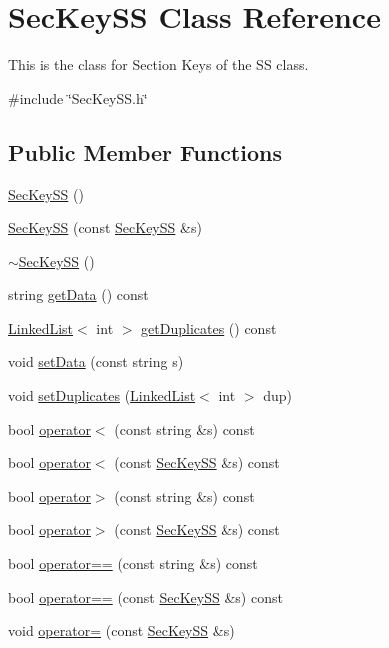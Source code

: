\hypertarget{classSecKeySS}{}\section{Sec\+Key\+SS Class Reference}
\label{classSecKeySS}


This is the class for Section Keys of the SS class.  




{\ttfamily \#include \char`\"{}Sec\+Key\+S\+S.\+h\char`\"{}}

\subsection*{Public Member Functions}
\begin{DoxyCompactItemize}
\item 
\hyperlink{classSecKeySS_ac9755234e20529a29a679c699007221c}{Sec\+Key\+SS} ()
\item 
\hyperlink{classSecKeySS_a3554b7d953e609578660dc27c8c855c5}{Sec\+Key\+SS} (const \hyperlink{classSecKeySS}{Sec\+Key\+SS} \&s)
\item 
\hyperlink{classSecKeySS_a298a0bd8755355351318c8f45f879e09}{$\sim$\+Sec\+Key\+SS} ()
\item 
string \hyperlink{classSecKeySS_add52510d280d0ca89b653386500f08f5}{get\+Data} () const
\item 
\hyperlink{classLinkedList}{Linked\+List}$<$ int $>$ \hyperlink{classSecKeySS_aaae9db891cfcdc3f78d8a44145f4f08c}{get\+Duplicates} () const
\item 
void \hyperlink{classSecKeySS_a36138c92d21970c5dc22c6517a139d2b}{set\+Data} (const string s)
\item 
void \hyperlink{classSecKeySS_ac1d550d7d3ad864f169d63523031a341}{set\+Duplicates} (\hyperlink{classLinkedList}{Linked\+List}$<$ int $>$ dup)
\item 
bool \hyperlink{classSecKeySS_a78079357a58189d507415df5200fa1de}{operator$<$} (const string \&s) const
\item 
bool \hyperlink{classSecKeySS_a7851dc86b5a8658d8dc8fd54174aaee9}{operator$<$} (const \hyperlink{classSecKeySS}{Sec\+Key\+SS} \&s) const
\item 
bool \hyperlink{classSecKeySS_a6b069a8bbb129059eab7158c3644c05d}{operator$>$} (const string \&s) const
\item 
bool \hyperlink{classSecKeySS_a6d33595d05da2f8160754962f3a72c9e}{operator$>$} (const \hyperlink{classSecKeySS}{Sec\+Key\+SS} \&s) const
\item 
bool \hyperlink{classSecKeySS_ac7ac8ff28deb97fe49c993a5e70c55c2}{operator==} (const string \&s) const
\item 
bool \hyperlink{classSecKeySS_ae0dd65edcf924c2ba31d713d43451937}{operator==} (const \hyperlink{classSecKeySS}{Sec\+Key\+SS} \&s) const
\item 
void \hyperlink{classSecKeySS_a3f4dd72a65e6485556389f44b6739d73}{operator=} (const \hyperlink{classSecKeySS}{Sec\+Key\+SS} \&s)
\end{DoxyCompactItemize}


